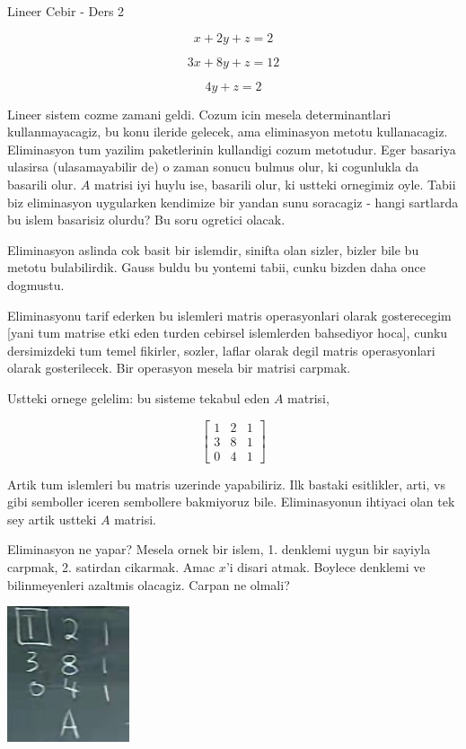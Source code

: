 \documentclass[12pt,fleqn]{article}\usepackage{../common}
\begin{document}
Lineer Cebir - Ders 2

$$ x + 2y + z = 2 $$

$$ 3x + 8y + z = 12 $$

$$ 4y + z = 2 $$

Lineer sistem cozme zamani geldi. Cozum icin mesela determinantlari
kullanmayacagiz, bu konu ileride gelecek, ama eliminasyon metotu
kullanacagiz. Eliminasyon tum yazilim paketlerinin kullandigi cozum
metotudur. Eger basariya ulasirsa (ulasamayabilir de) o zaman sonucu bulmus
olur, ki cogunlukla da basarili olur. $A$ matrisi iyi huylu ise, basarili
olur, ki ustteki ornegimiz oyle. Tabii biz eliminasyon uygularken kendimize
bir yandan sunu soracagiz - hangi sartlarda bu islem basarisiz olurdu? Bu
soru ogretici olacak. 

Eliminasyon aslinda cok basit bir islemdir, sinifta olan sizler, bizler
bile bu metotu bulabilirdik. Gauss buldu bu yontemi tabii, cunku bizden
daha once dogmustu. 

Eliminasyonu tarif ederken bu islemleri matris operasyonlari olarak
gosterecegim [yani tum matrise etki eden turden cebirsel islemlerden
bahsediyor hoca], cunku dersimizdeki tum temel fikirler, sozler, laflar
olarak degil matris operasyonlari olarak gosterilecek. Bir operasyon mesela
bir matrisi carpmak. 

Ustteki ornege gelelim: bu sisteme tekabul eden $A$ matrisi, 

$$ 
\left[\begin{array}{rrr}
1 & 2 & 1 \\
3 & 8 & 1 \\
0 & 4 & 1
\end{array}\right]
 $$

Artik tum islemleri bu matris uzerinde yapabiliriz. Ilk bastaki esitlikler,
arti, vs gibi semboller iceren sembollere bakmiyoruz bile. Eliminasyonun
ihtiyaci olan tek sey artik ustteki $A$ matrisi. 

Eliminasyon ne yapar? Mesela ornek bir islem, 1. denklemi uygun bir sayiyla
carpmak, 2. satirdan cikarmak. Amac $x$'i disari atmak. Boylece denklemi ve
bilinmeyenleri azaltmis olacagiz. Carpan ne olmali? 

\includegraphics[height=4cm]{2_01.png}
\end{document}
